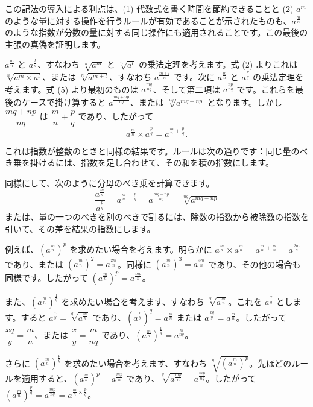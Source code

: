 \documentclass[a4paper,11pt,openany]{ltjsbook}
\begin{document}
この記法の導入による利点は、(1) 代数式を書く時間を節約できることと (2) $a^{m}$ のような量に対する操作を行うルールが有効であることが示されたものも、$a^{\frac{m}{n}}$ のような指数が分数の量に対する同じ操作にも適用されることです。この最後の主張の真偽を証明します。

$a^{\frac{m}{n}}$ と $a^{\frac{l}{n}}$、すなわち $\sqrt[n]{a^{m}}$ と $\sqrt[n]{a^{l}}$ の乗法定理を考えます。式 (2) よりこれは $\sqrt[n]{a^{m} × a^{l}}$、または $\sqrt[n]{a^{m+l}}$、すなわち $a^{\frac{m+l}{n}}$ です。次に $a^{\frac{m}{n}}$ と $a^{\frac{p}{q}}$ の乗法定理を考えます。式 (5) より最初のものは $a^{\frac{mq}{nq}}$、そして第二項は $a^{\frac{np}{nq}}$ です。これらを最後のケースで掛け算すると $a^{\frac{mq+np}{nq}}$、または $\sqrt[nq]{a^{mq+np}}$ となります。しかし $\dfrac{mq + np}{nq}$ は $\dfrac{m}{n} + \dfrac{p}{q}$ であり、したがって
\[
a^{\frac{m}{n}} × a^{\frac{p}{q}}
  = a^{\frac{m}{n}+\frac{p}{q}}. \tag{6}
\]

これは指数が整数のときと同様の結果です。ルールは次の通りです：同じ量のべき乗を掛けるには、指数を足し合わせて、その和を積の指数にします。

同様にして、次のように分母のべき乗を計算できます。
\[
\frac{a^{\frac{m}{n}}}{a^{\frac{p}{q}}} = a^{\frac{m}{n} - \frac{p}{q}} = a^{\frac{mq - np}{nq}} = \sqrt[nq]{a^{mq - np}}
\]
または、量の一つのべきを別のべきで割るには、除数の指数から被除数の指数を引いて、その差を結果の指数にします。

例えば、$(a^{\frac{m}{n}})^p$ を求めたい場合を考えます。明らかに $a^{\frac{m}{n}} \times a^{\frac{m}{n}} = a^{\frac{m}{n} + \frac{m}{n}} = a^{\frac{2m}{n}}$ であり、または $(a^{\frac{m}{n}})^2 = a^{\frac{2m}{n}}$。同様に $(a^{\frac{m}{n}})^3 = a^{\frac{3m}{n}}$ であり、その他の場合も同様です。したがって $(a^{\frac{m}{n}})^p = a^{\frac{mp}{n}}$。

また、$(a^{\frac{m}{n}})^{\frac{1}{q}}$ を求めたい場合を考えます、すなわち $\sqrt[q]{a^{\frac{m}{n}}}$。これを $a^{\frac{x}{y}}$ とします。すると $a^{\frac{x}{y}} = \sqrt[q]{a^{\frac{m}{n}}}$ であり、$(a^{\frac{x}{y}})^q = a^{\frac{m}{n}}$ または $a^{\frac{xq}{y}} = a^{\frac{m}{n}}$。したがって $\dfrac{xq}{y} = \dfrac{m}{n}$、または $\dfrac{x}{y} = \dfrac{m}{nq}$ であり、$(a^{\frac{m}{n}})^{\frac{1}{q}} = a^{\frac{m}{nq}}$。

さらに $(a^{\frac{m}{n}})^{\frac{p}{q}}$ を求めたい場合を考えます、すなわち $\sqrt[q]{(a^{\frac{m}{n}})^p}$。先ほどのルールを適用すると、$(a^{\frac{m}{n}})^p = a^{\frac{mp}{n}}$ であり、$\sqrt[q]{a^{\frac{mp}{n}}} = a^{\frac{mp}{nq}}$。したがって $(a^{\frac{m}{n}})^{\frac{p}{q}} = a^{\frac{mp}{nq}} = a^{\frac{m}{n} \times \frac{p}{q}}$。
\end{document}
